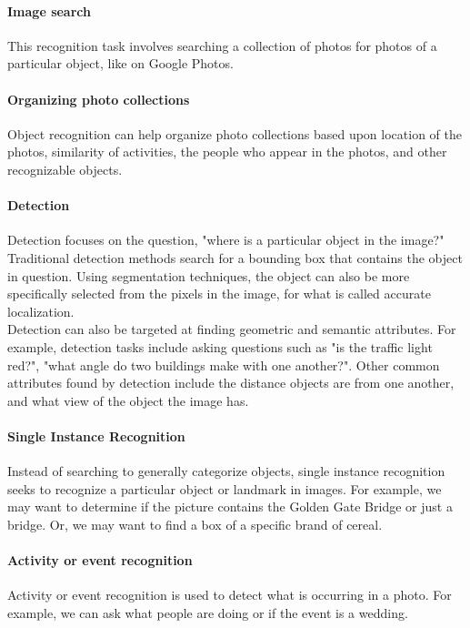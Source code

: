 \documentclass{article}
\begin{document}
\paragraph{Image search} 
This recognition task involves searching a collection of photos for photos of a particular object, like on Google Photos.

\paragraph{Organizing photo collections} 
Object recognition can help organize photo collections based upon location of the photos, similarity of activities, the people who appear in the photos, and other recognizable objects.

\paragraph{Detection}
Detection focuses on the question, "where is a particular object in the image?" Traditional detection methods search for a bounding box that contains the object in question. Using segmentation techniques, the object can also be more specifically selected from the pixels in the image, for what is called accurate localization. \\
Detection can also be targeted at finding geometric and semantic attributes. For example, detection tasks include asking questions such as "is the traffic light red?", "what angle do two buildings make with one another?". Other common attributes found by detection include the distance objects are from one another, and what view of the object the image has.

\paragraph{Single Instance Recognition}
Instead of searching to generally categorize objects, single instance recognition seeks to recognize a particular object or landmark in images. For example, we may want to determine if the picture contains the Golden Gate Bridge or just a bridge. Or, we may want to find a box of a specific brand of cereal.

\paragraph{Activity or event recognition} Activity or event recognition is used to detect what is occurring in a photo. For example, we can ask what people are doing or if the event is a wedding.
\end{document}

